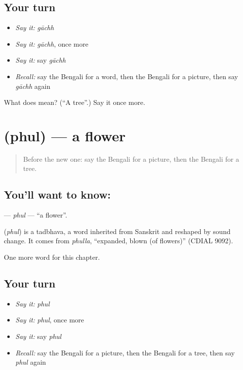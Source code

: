 \subsection*{Your turn}
\begin{itemize}
\raggedright
  \item \emph{Say it:} \emph{gāchh}
  \item \emph{Say it:} \emph{gāchh}, once more
  \item \emph{Say it:} say \emph{gāchh}
  \item \emph{Recall:} say the Bengali for a word, then the Bengali for a picture, then say \emph{gāchh} again
\end{itemize}

\begin{tcolorbox}[breakable,colback=teal!4,colframe=teal!35!black,title={Before you move on}]
What does  mean? (\textquotedblleft{}A tree\textquotedblright{}.) Say it once more.
\end{tcolorbox}
\section[\texorpdfstring{\bn{ফুল} (phul)}{ফুল (phul)}]{ (phul) — a flower}

\label{lesson:BN-C65-phul}



\begin{quote}
Before the new one: say the Bengali for a picture, then the Bengali for a tree.
\end{quote}

\subsection*{You'll want to know: }
\textbf{} — \emph{phul} — \textquotedblleft{}a flower\textquotedblright{}.

\begin{cousinweb}
\textbf{} (\emph{phul}) is a tadbhava, a word inherited from Sanskrit and reshaped by sound change. It comes from \emph{phulla}, \textquotedblleft{}expanded, blown (of flowers)\textquotedblright{} (CDIAL 9092).
\end{cousinweb}

\begin{grammarlens}[title={What you've built}]
One more word for this chapter.
\end{grammarlens}

\subsection*{Your turn}
\begin{itemize}
\raggedright
  \item \emph{Say it:} \emph{phul}
  \item \emph{Say it:} \emph{phul}, once more
  \item \emph{Say it:} say \emph{phul}
  \item \emph{Recall:} say the Bengali for a picture, then the Bengali for a tree, then say \emph{phul} again
\end{itemize}

